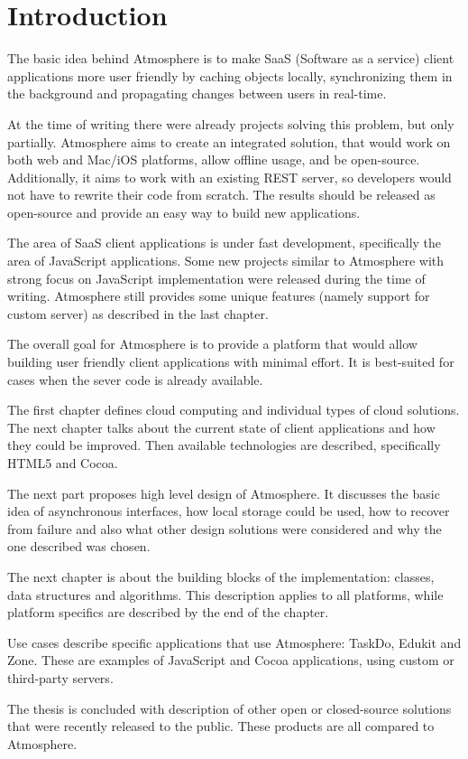 \setcounter{page}{1}
\setcounter{equation}{0}
\setcounter{figure}{0}
\setcounter{table}{0}

\section*{Introduction}

The basic idea behind Atmosphere is to make SaaS (Software as a service) client applications more user friendly by caching objects locally, synchronizing them in the background and propagating changes between users in real-time.

At the time of writing there were already projects solving this problem, but only partially. Atmosphere aims to create an integrated solution, that would work on both web and Mac/iOS platforms, allow offline usage, and be open-source. Additionally, it aims to work with an existing REST server, so developers would not have to rewrite their code from scratch. The results should be released as open-source and provide an easy way to build new applications.

The area of SaaS client applications is under fast development, specifically the area of JavaScript applications. Some new projects similar to Atmosphere with strong focus on JavaScript implementation were released during the time of writing. Atmosphere still provides some unique features (namely support for custom server) as described in the last chapter.

The overall goal for Atmosphere is to provide a platform that would allow building user friendly client applications with minimal effort. It is best-suited for cases when the sever code is already available.

The first chapter defines cloud computing and individual types of cloud solutions. The next chapter talks about the current state of client applications and how they could be improved. Then available technologies are described, specifically HTML5 and Cocoa.

The next part proposes high level design of Atmosphere. It discusses the basic idea of asynchronous interfaces, how local storage could be used, how to recover from failure and also what other design solutions were considered and why the one described was chosen.

The next chapter is about the building blocks of the implementation: classes, data structures and algorithms. This description applies to all platforms, while platform specifics are described by the end of the chapter.

Use cases describe specific applications that use Atmosphere: TaskDo, Edukit and Zone. These are examples of JavaScript and Cocoa applications, using custom or third-party servers.

The thesis is concluded with description of other open or closed-source solutions that were recently released to the public. These products are all compared to Atmosphere.